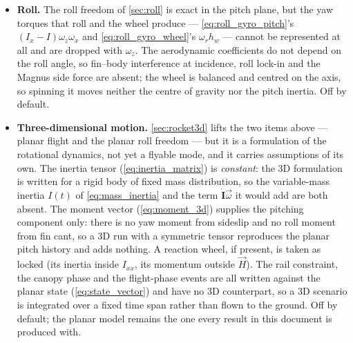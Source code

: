 \begin{itemize}
    \autoref{eq:flightpath_rate} (\autoref{sec:analysis_flightpath}) is an analysis-only model: it
    strips the airframe of its rotational degree of freedom entirely (no aerodynamic normal force,
    thrust aligned with the velocity vector, a flat non-rotating Earth, still air) and is never
    integrated by the simulator, which always carries the full rotational dynamics of
    \autoref{eq:eom_rot}.
    \item \textbf{Roll.} The roll freedom of \autoref{sec:roll} is exact in the pitch plane, but
    the yaw torques that roll and the wheel produce --- \autoref{eq:roll_gyro_pitch}'s
    $(I_x-I)\omega_z\omega_x$ and \autoref{eq:roll_gyro_wheel}'s $\omega_rh_w$ --- cannot be
    represented at all and are dropped with $\omega_z$. The aerodynamic coefficients do not depend
    on the roll angle, so fin--body interference at incidence, roll lock-in and the Magnus side
    force are absent; the wheel is balanced and centred on the axis, so spinning it moves neither
    the centre of gravity nor the pitch inertia. Off by default.
    \item \textbf{Three-dimensional motion.} \autoref{sec:rocket3d} lifts the two items above ---
    planar flight and the planar roll freedom --- but it is a formulation of the rotational
    dynamics, not yet a flyable mode, and it carries assumptions of its own. The inertia tensor
    (\autoref{eq:inertia_matrix}) is \emph{constant}: the 3D formulation is written for a rigid body
    of fixed mass distribution, so the variable-mass inertia $I(t)$ of \autoref{eq:mass_inertia} and
    the term $\dot{\mathbf{I}}\vec\omega$ it would add are both absent. The moment vector
    (\autoref{eq:moment_3d}) supplies the pitching component only: there is no yaw moment from
    sideslip and no roll moment from fin cant, so a 3D run with a symmetric tensor reproduces the
    planar pitch history and adds nothing. A reaction wheel, if present, is taken as locked (its
    inertia inside $I_{xx}$, its momentum outside $\vec{H}$). The rail constraint, the canopy phase
    and the flight-phase events are all written against the planar state
    (\autoref{eq:state_vector}) and have no 3D counterpart, so a 3D scenario is integrated over a
    fixed time span rather than flown to the ground. Off by default; the planar model remains the
    one every result in this document is produced with.
\end{itemize}
